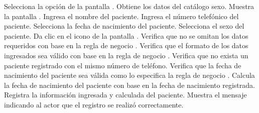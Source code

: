 \begin{UCtrayectoria}
	\UCpaso[\UCactor] Selecciona la opción \btnRegistro{} de la pantalla .
	\UCpaso[\UCsist] Obtiene los datos del catálogo sexo.
	\UCpaso[\UCsist] Muestra la pantalla .
	\UCpaso[\UCactor] Ingresa el nombre del paciente.
	\UCpaso[\UCactor] Ingresa el número telefónico del paciente.
	\UCpaso[\UCactor] Selecciona la fecha de nacimiento del paciente.
	\UCpaso[\UCactor] Selecciona el sexo del paciente.
	\UCpaso[\UCactor] Da clic en el icono \btnRegistrar{} de la pantalla .
	\UCpaso[\UCsist] Verifica que no se omitan los datos requeridos con base en la regla de negocio . 
	\UCpaso[\UCsist] Verifica que el formato de los datos ingresados sea válido con base en la regla de negocio . 
	\UCpaso[\UCsist] Verifica que no exista un paciente registrado con el mismo número de teléfono. 
	\UCpaso[\UCsist] Verifica que la fecha de nacimiento del paciente sea válida como lo especifica la regla de negocio . 
	\UCpaso[\UCsist] Calcula la fecha de nacimiento del paciente con base en la fecha de nacimiento registrada.
	\UCpaso[\UCsist] Registra la información ingresada y calculada del paciente.
	\UCpaso[\UCsist] Muestra el mensaje  indicando al actor que el registro se realizó correctamente.
\end{UCtrayectoria}

%	

